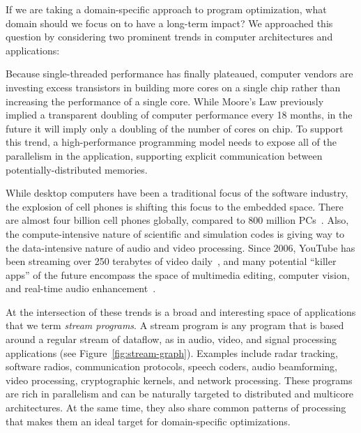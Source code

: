 If we are taking a domain-specific approach to program optimization,
what domain should we focus on to have a long-term impact?  We
approached this question by considering two prominent trends in
computer architectures and applications:

\mybegin

  Because
  single-threaded performance has finally plateaued, computer vendors
  are investing excess transistors in building more cores on a single
  chip rather than increasing the performance of a single core.  While
  Moore's Law previously implied a transparent doubling of computer
  performance every 18 months, in the future it will imply only a
  doubling of the number of cores on chip.  To support this trend, a
  high-performance programming model needs to expose all of the
  parallelism in the application, supporting explicit communication
  between potentially-distributed memories.

  While desktop computers have been a traditional
  focus of the software industry, the explosion of cell phones is
  shifting this focus to the embedded space.  There are almost four
  billion cell phones globally, compared to 800 million
  PCs~\cite{medford_microsoft/yahoo_2008}.  Also, the
  compute-intensive nature of scientific and simulation codes is
  giving way to the data-intensive nature of audio and video
  processing.  Since 2006, YouTube has been streaming over 250
  terabytes of video daily~\cite{watkins_mash_2006}, and many
  potential ``killer apps'' of the future encompass the space of
  multimedia editing, computer vision, and real-time audio
  enhancement~\cite{asanovic_landscape_2006,chen_convergence_2008}.

\myend


At the intersection of these trends is a broad and interesting space
of applications that we term {\it stream programs}.  A stream program
is any program that is based around a regular stream of dataflow, as
in audio, video, and signal processing applications (see
Figure~\ref{fig:stream-graph}).  
Examples include radar tracking, software radios, communication
protocols, speech coders, audio beamforming, video processing,
cryptographic kernels, and network processing.  These programs are
rich in parallelism and can be naturally targeted to distributed and
multicore architectures.  At the same time, they also share common
patterns of processing that makes them an ideal target for
domain-specific optimizations.

